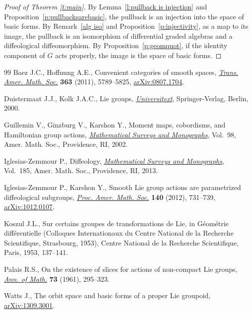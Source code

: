 \documentclass[11pt]{article}
\numberwithin{equation}{section}
\newcommand{\hypref}[2]{{#2~\ref{#1}}}
\begin{document}
\begin{proof}[Proof of Theorem \ref{t:main}]
By \hypref{l:pullback is injection}{Lemma}
and \hypref{p:pullbacksarebasic}{Proposition},
the pullback is an injection into the space of basic forms.
By \hypref{alg iso}{Remark} and \hypref{p:injectivity}{Proposition},
as a map to its image,
the pullback is an isomorphism of dif\/ferential graded algebras
and a dif\/feological dif\/feomorphism.
By \hypref{p:geomquot}{Proposition}, if the identity component of $G$
acts properly, the image is the space of basic forms.
\end{proof}
\begin{thebibliography}{99}
Baez J.C., Hof\/fnung A.E., Convenient categories of smooth spaces,
 \href{http://dx.doi.org/10.1090/S0002-9947-2011-05107-X}{\textit{Trans. Amer. Math. Soc.}} \textbf{363} (2011), 5789--5825,
 \href{http://arxiv.org/abs/0807.1704}{arXiv:0807.1704}.

Duistermaat J.J., Kolk J.A.C., Lie groups, \href{http://dx.doi.org/10.1007/978-3-642-56936-4}{\textit{Universitext}}, Springer-Verlag,
 Berlin, 2000.

Guillemin V., Ginzburg V., Karshon Y., Moment maps, cobordisms, and
 {H}amiltonian group actions, \href{http://dx.doi.org/10.1090/surv/098}{\textit{Mathematical Surveys and Monographs}},
 Vol.~98, Amer. Math. Soc., Providence, RI, 2002.

Iglesias-Zemmour P., Dif\/feology, \href{http://dx.doi.org/10.1090/surv/185}{\textit{Mathematical Surveys and Monographs}},
 Vol.~185, Amer. Math. Soc., Providence, RI, 2013.

Iglesias-Zemmour P., Karshon Y., Smooth {L}ie group actions are parametrized
 dif\/feological subgroups, \href{http://dx.doi.org/10.1090/S0002-9939-2011-11301-7}{\textit{Proc. Amer. Math. Soc.}} \textbf{140} (2012),
 731--739, \href{http://arxiv.org/abs/1012.0107}{arXiv:1012.0107}.

Koszul J.L., Sur certains groupes de transformations de {L}ie, in G\'eom\'etrie
 dif\/f\'erentielle ({C}olloques {I}nternationaux du {C}entre {N}ational de la
 {R}echerche {S}cientif\/ique, {S}trasbourg, 1953), Centre National de la
 Recherche Scientif\/ique, Paris, 1953, 137--141.

Palais R.S., On the existence of slices for actions of non-compact {L}ie
 groups, \href{http://dx.doi.org/10.2307/1970335}{\textit{Ann. of Math.}} \textbf{73} (1961), 295--323.

Watts J., The orbit space and basic forms of a proper Lie groupoid,
 \href{http://arxiv.org/abs/1309.3001}{arXiv:1309.3001}.

\end{thebibliography}
\end{document}
